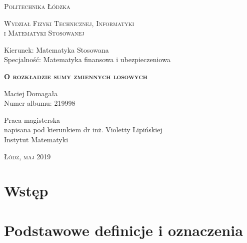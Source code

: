\documentclass[12pt,a4paper,openany]{book}
\begin{document}
\begin{titlepage}
\begin{flushleft}
\end{flushleft}
\begin{center}
\textsc{{\huge Politechnika Łódzka}}
\end{center}
\bigskip
\bigskip
\begin{center}
\textsc{{\Large Wydział Fizyki Technicznej, Informatyki \\i Matematyki Stosowanej}}
\end{center}
\bigskip
\bigskip
\begin{center}
\begin{Large}
Kierunek: Matematyka Stosowana\\
Specjalność: Matematyka finansowa i ubezpieczeniowa
\end{Large}
\end{center}
\bigskip
\bigskip
\noindent\hrulefill
\begin{center}
\textsc{\textbf{{\large O rozkładzie sumy zmiennych losowych
\\}}}
\bigskip
\bigskip

{\large 
Maciej Domagała
\\
Numer albumu: 
219998
\\}
\end{center}
\noindent\hrulefill
\bigskip
\bigskip
\begin{center}
{\large Praca magisterska\\
napisana pod kierunkiem dr inż. Violetty Lipińskiej \\
Instytut Matematyki
 }
\end{center}
\bigskip
\bigskip
\bigskip
\bigskip
\begin{center}
{\textsc{\large Łódź, maj 2019
}}
\end{center}
\end{titlepage}






\tableofcontents



\chapter*{Wstęp}



 
\chapter{Podstawowe definicje i oznaczenia}
\end{document}
